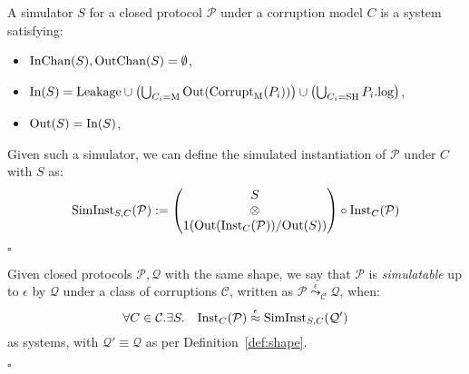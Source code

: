 \begin{definition}
  A simulator $S$ for a closed protocol $\mathcal{P}$ under a corruption
  model $C$ is a system satisfying:
  \begin{itemize}
    \item $\text{InChan}(S), \text{OutChan}(S) = \emptyset$,
    \item $\text{In}(S) = \text{Leakage} \cup \left(\bigcup_{C_i = \text{M}} \text{Out}(\text{Corrupt}_{\text{M}}(P_i))\right) \cup \left(\bigcup_{C_i = \text{SH}} P_i.\text{log}\right)$,
    \item $\text{Out}(S) = \text{In}(S)$,
  \end{itemize}

  Given such a simulator, we can define the simulated instantiation
  of $\mathcal{P}$ under $C$ with $S$ as:
  $$
  \text{SimInst}_{S, C}(\mathcal{P}) := 
  \begin{pmatrix}
    S\cr
    \otimes\cr
    1(\text{Out}(\text{Inst}_C(\mathcal{P})) / \text{Out}(S))
  \end{pmatrix}
  \circ \text{Inst}_C(\mathcal{P})
  $$

  $\square$
\end{definition}

\begin{definition}[Simulatability]
  Given closed protocols $\mathcal{P}, \mathcal{Q}$ with the same shape,
  we say that $\mathcal{P}$ is \emph{simulatable} up to $\epsilon$ by $\mathcal{Q}$
  under a class of corruptions $\mathcal{C}$,
  written as $\mathcal{P} \overset{\epsilon}{\leadsto}_{\mathcal{C}} \mathcal{Q}$,
  when:
  $$
  \forall C \in \mathcal{C}.\exists S.\quad \text{Inst}_C(\mathcal{P}) \overset{\epsilon}{\approx} \text{SimInst}_{S, C}(\mathcal{Q}')
  $$
  as systems, with $\mathcal{Q}' \equiv \mathcal{Q}$ as per 
  Definition~\ref{def:shape}.

  $\square$
\end{definition}

